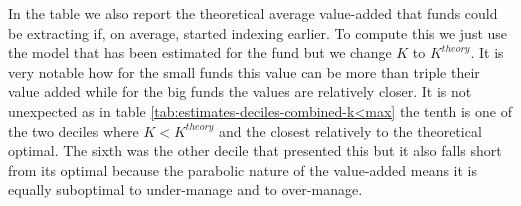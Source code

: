 \documentclass[12pt]{article}
\begin{document}
\par In the table we also report the theoretical average value-added that funds could be extracting if, on average, started indexing earlier. To compute this we just use the model that has been estimated for the fund but we change $K$ to $K^{theory}$. It is very notable how for the small funds this value can be more than triple their value added while for the big funds the values are relatively closer. It is not unexpected as in table \ref{tab:estimates-deciles-combined-k<max} the tenth is one of the two deciles where $K < K^{theory}$ and the closest relatively to the theoretical optimal. The sixth was the other decile that presented this but it also falls short from its optimal because the parabolic nature of the value-added means it is equally suboptimal to under-manage and to over-manage.
\end{document}
